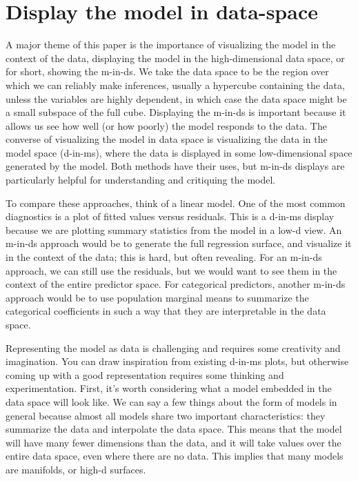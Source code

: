 \documentclass[preprint]{imsart}
\begin{document}
\section{Display the model in data-space}
\label{sec:m-in-ds}

A major theme of this paper is the importance of visualizing the model in the context of the data, displaying the model in the high-dimensional data space, or for short, showing the m-in-ds. We take the data space to be the region over which we can reliably make inferences, usually a hypercube containing the data, unless the variables are highly dependent, in which case the data space might be a small subspace of the full cube. Displaying the m-in-ds is important because it allows us see how well (or how poorly) the model responds to the data. The converse of visualizing the model in data space is visualizing the data in the model space (d-in-ms), where the data is displayed in some low-dimensional space generated by the model. Both methods have their uses, but m-in-ds displays are particularly helpful for understanding and critiquing the model.

To compare these approaches, think of a linear model. One of the most common diagnostics is a plot of fitted values versus residuals. This is a d-in-ms display because we are plotting summary statistics from the model in a low-d view. An m-in-ds approach would be to generate the full regression surface, and visualize it in the context of the data; this is hard, but often revealing. For an m-in-ds approach, we can still use the residuals, but we would want to see them in the context of the entire predictor space. For categorical predictors, another m-in-ds approach would be to use population marginal means \citep{searle:1980} to summarize the categorical coefficients in such a way that they are interpretable in the data space.

Representing the model as data is challenging and requires some creativity and imagination. You can draw inspiration from existing d-in-ms plots, but otherwise coming up with a good representation requires some thinking and experimentation. First, it's worth considering what a model embedded in the data space will look like. We can say a few things about the form of models in general because almost all models share two important characteristics: they summarize the data and interpolate the data space. This means that the model will have many fewer dimensions than the data, and it will take values over the entire data space, even where there are no data. This implies that many models are manifolds, or high-d surfaces.
\end{document}

